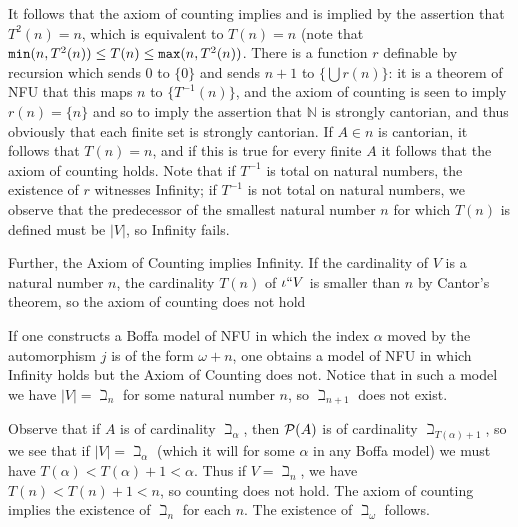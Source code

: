 \documentclass[12pt]{article}
\begin{document}
It follows that the axiom of counting implies and is implied by the assertion that $T^2(n) = n$, which is equivalent to $T(n) = n$ (note that ${\tt min}(n,T^2(n)) \leq T(n) \leq {\tt max}(n,T^2(n))$.  There is a function $r$ definable by recursion which sends 0 to $\{0\}$
and sends $n+1$ to $\{\bigcup r(n)\}$:  it is a theorem of NFU that this maps $n$ to $\{T^{-1}(n)\}$, and the axiom of counting is seen to imply $r(n) = \{n\}$ and so to imply the assertion that $\mathbb N$ is strongly cantorian,
and thus obviously that each finite set is strongly cantorian.  If $A \in n$ is cantorian, it follows that $T(n) = n$, and if this is true for every finite $A$ it follows that the axiom of counting holds.   Note that if $T^{-1}$ is total on natural numbers,
the existence of $r$ witnesses Infinity; if $T^{-1}$ is not total on natural numbers, we observe that the predecessor of the smallest natural number $n$ for which $T(n)$ is defined must be $|V|$, so Infinity fails.

Further, the Axiom of Counting implies Infinity.  If the cardinality of $V$ is a natural number $n$, the cardinality $T(n)$ of $\iota``V$ is smaller than $n$ by Cantor's theorem, so the axiom of counting does not hold

If one constructs a Boffa model of NFU in which the index $\alpha$ moved by the automorphism $j$ is of the form $\omega +n$, one obtains a model of NFU in which Infinity holds but the Axiom of Counting does not.  Notice that in such a
model we have $|V| = \beth_n$ for some natural number $n$, so $\beth_{n+1}$ does not exist.

Observe that if $A$ is of cardinality $\beth_\alpha$, then ${\cal P}(A)$ is of cardinality $\beth_{T(\alpha)+1}$, so we see that if $|V| = \beth_{\alpha}$ (which it will for some $\alpha$ in any Boffa model) we must have $T(\alpha)<T(\alpha)+1 <\alpha$.
Thus if $V = \beth_n$, we have $T(n)<T(n)+1<n$, so counting does not hold.  The axiom of counting implies the existence of $\beth_n$ for each $n$.  The existence of $\beth_\omega$ follows.
\end{document}
